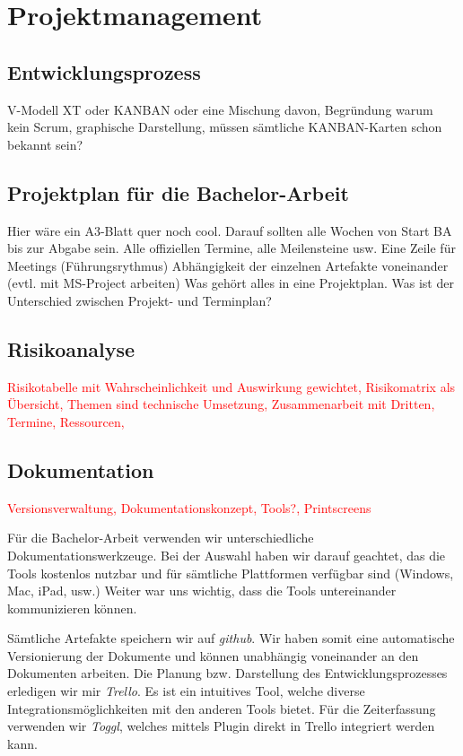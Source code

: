 \documentclass[a4paper,ngerman, 11pt]{report}
\newcommand\Diskussionspunkt[1]{\textcolor{red}{#1}}
\begin{document}
\chapter{Projektmanagement}
\section{Entwicklungsprozess}
V-Modell XT oder KANBAN oder eine Mischung davon, Begründung warum kein Scrum, graphische Darstellung, müssen sämtliche KANBAN-Karten schon bekannt sein?


\section{Projektplan für die Bachelor-Arbeit}
Hier wäre ein A3-Blatt quer noch cool. Darauf sollten alle Wochen von Start BA bis zur Abgabe sein.
Alle offiziellen Termine, alle Meilensteine usw.
Eine Zeile für Meetings (Führungsrythmus)
Abhängigkeit der einzelnen Artefakte voneinander (evtl. mit MS-Project arbeiten)
Was gehört alles in eine Projektplan. Was ist der Unterschied zwischen Projekt- und Terminplan?

\section{Risikoanalyse}
   
\Diskussionspunkt{Risikotabelle mit Wahrscheinlichkeit und Auswirkung gewichtet, Risikomatrix als Übersicht, Themen sind technische Umsetzung, Zusammenarbeit mit Dritten, Termine, Ressourcen, }



\section{Dokumentation}
\Diskussionspunkt{Versionsverwaltung, Dokumentationskonzept, Tools?, Printscreens}

Für die Bachelor-Arbeit verwenden wir unterschiedliche Dokumentationswerkzeuge. Bei der Auswahl haben wir darauf geachtet, das die Tools kostenlos nutzbar und für sämtliche Plattformen verfügbar sind (Windows, Mac, iPad, usw.) Weiter war uns wichtig, dass die Tools untereinander kommunizieren können. 

Sämtliche Artefakte speichern wir auf \textit{github}. Wir haben somit eine automatische Versionierung der Dokumente und können unabhängig voneinander an den Dokumenten arbeiten. Die Planung bzw. Darstellung des Entwicklungsprozesses erledigen wir mir \textit{Trello}. Es ist ein intuitives Tool, welche diverse Integrationsmöglichkeiten mit den anderen Tools bietet. Für die Zeiterfassung verwenden wir \textit{Toggl}, welches mittels Plugin direkt in Trello integriert werden kann.
\end{document}
